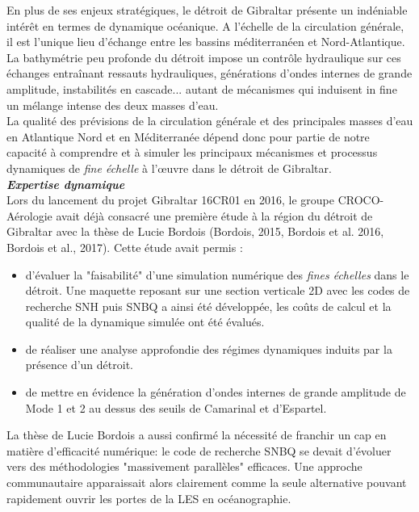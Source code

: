 \documentclass[a4paper,11pt]{report}
\begin{document}
En plus de ses enjeux stratégiques, le détroit de Gibraltar présente un indéniable intérêt en termes de dynamique océanique. A l'échelle de la circulation générale, il est l'unique lieu d'échange entre les bassins méditerranéen et Nord-Atlantique. La bathymétrie peu profonde du détroit impose un contrôle hydraulique sur ces échanges entraînant ressauts hydrauliques, générations d'ondes internes de grande amplitude, instabilités en cascade... autant de mécanismes qui induisent in fine un mélange intense des deux masses d'eau.\\
La qualité des prévisions de la circulation générale et des principales masses d'eau en Atlantique Nord et en Méditerranée dépend donc pour partie de notre capacité à comprendre et à simuler les principaux mécanismes et processus dynamiques de \textit{fine échelle} à l'œuvre dans le détroit de Gibraltar.\\

\noindent \textbf{\textit{Expertise dynamique}}\\
Lors du lancement du projet Gibraltar 16CR01 en 2016, le groupe CROCO-Aérologie avait déjà consacré une première étude à la région du détroit de Gibraltar avec la thèse de Lucie Bordois (Bordois, 2015, Bordois et al. 2016, Bordois et al., 2017). Cette étude avait permis :
\begin{itemize}
	\item  d'évaluer la "faisabilité" d'une simulation numérique des \textit{fines échelles} dans le détroit. Une maquette reposant sur une section verticale 2D avec les codes de recherche SNH puis SNBQ a ainsi été développée, les coûts de calcul et la qualité de la dynamique simulée ont été évalués.
	\item de réaliser une analyse approfondie des régimes dynamiques induits par la présence d'un détroit.
	\item de mettre en évidence la génération d'ondes internes de grande amplitude de Mode 1 et 2 au dessus des seuils de Camarinal et d'Espartel.
\end{itemize}
La thèse de Lucie Bordois a aussi confirmé la nécessité de franchir un cap en matière d'efficacité numérique: le code de recherche SNBQ se devait d'évoluer vers des méthodologies "massivement parallèles" efficaces. Une approche communautaire apparaissait alors clairement comme la seule alternative pouvant rapidement ouvrir les portes de la LES en océanographie. \\
\end{document}
